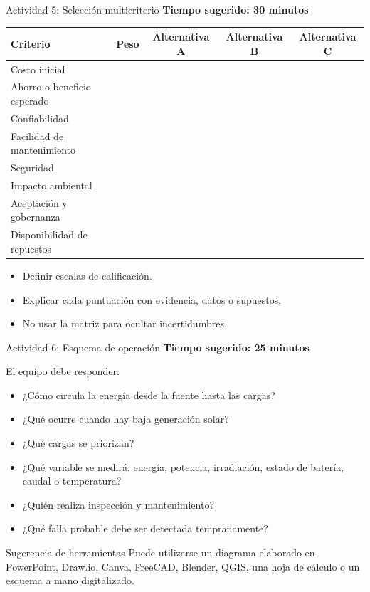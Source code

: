 \documentclass[aspectratio=169,10pt]{beamer}
\begin{document}
\begin{frame}{Actividad 5: Selección multicriterio}
\textbf{Tiempo sugerido: 30 minutos}

\begin{table}
\centering
\small
\begin{tabular}{p{} c c c c}
\toprule
\textbf{Criterio} & \textbf{Peso} & \textbf{Alternativa A} & \textbf{Alternativa B} & \textbf{Alternativa C} \\
\midrule
Costo inicial & & & & \\
Ahorro o beneficio esperado & & & & \\
Confiabilidad & & & & \\
Facilidad de mantenimiento & & & & \\
Seguridad & & & & \\
Impacto ambiental & & & & \\
Aceptación y gobernanza & & & & \\
Disponibilidad de repuestos & & & & \\
\bottomrule
\end{tabular}
\end{table}

\begin{itemize}
    \item Definir escalas de calificación.
    \item Explicar cada puntuación con evidencia, datos o supuestos.
    \item No usar la matriz para ocultar incertidumbres.
\end{itemize}
\end{frame}

\begin{frame}{Actividad 6: Esquema de operación}
\textbf{Tiempo sugerido: 25 minutos}

El equipo debe responder:

\begin{itemize}
    \item ¿Cómo circula la energía desde la fuente hasta las cargas?
    \item ¿Qué ocurre cuando hay baja generación solar?
    \item ¿Qué cargas se priorizan?
    \item ¿Qué variable se medirá: energía, potencia, irradiación, estado de batería, caudal o temperatura?
    \item ¿Quién realiza inspección y mantenimiento?
    \item ¿Qué falla probable debe ser detectada tempranamente?
\end{itemize}

\begin{block}{Sugerencia de herramientas}
Puede utilizarse un diagrama elaborado en PowerPoint, Draw.io, Canva, FreeCAD, Blender, QGIS, una hoja de cálculo o un esquema a mano digitalizado.
\end{block}
\end{frame}
\end{document}
